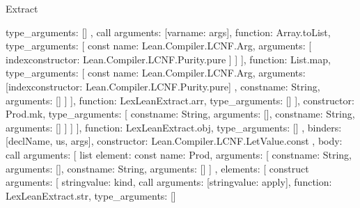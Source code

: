 \begin{lexlean}{Extract}
\begin{toolingmodule}
{{{{{{{{{{{                                    type_arguments: []
                                  }
                                },
                                call{
                                  arguments: [var{name: args}],
                                  function: Array.toList,
                                  type_arguments: [
                                    const{
                                      name: Lean.Compiler.LCNF.Arg,
                                      arguments: [
                                        index{constructor: Lean.Compiler.LCNF.Purity.pure}
                                      ]
                                    }
                                  ]
                                }
                              ],
                              function: List.map,
                              type_arguments: [
                                const{
                                  name: Lean.Compiler.LCNF.Arg,
                                  arguments: [index{constructor: Lean.Compiler.LCNF.Purity.pure}]
                                },
                                const{name: String, arguments: []}
                              ]
                            }
                          ],
                          function: LexLeanExtract.arr,
                          type_arguments: []
                        }
                      ],
                      constructor: Prod.mk,
                      type_arguments: [
                        const{name: String, arguments: []},
                        const{name: String, arguments: []}
                      ]
                    }
                  ]
                }
              ],
              function: LexLeanExtract.obj,
              type_arguments: []
            },
            binders: [declName, us, args],
            constructor: Lean.Compiler.LCNF.LetValue.const
          },
          {
            body: call{
              arguments: [
                list{
                  element: const{
                    name: Prod,
                    arguments: [
                      const{name: String, arguments: []},
                      const{name: String, arguments: []}
                    ]
                  },
                  elements: [
                    construct{
                      arguments: [
                        string{value: kind},
                        call{
                          arguments: [string{value: apply}],
                          function: LexLeanExtract.str,
                          type_arguments: []
}}}}}}}}
\end{toolingmodule}
\end{lexlean}
